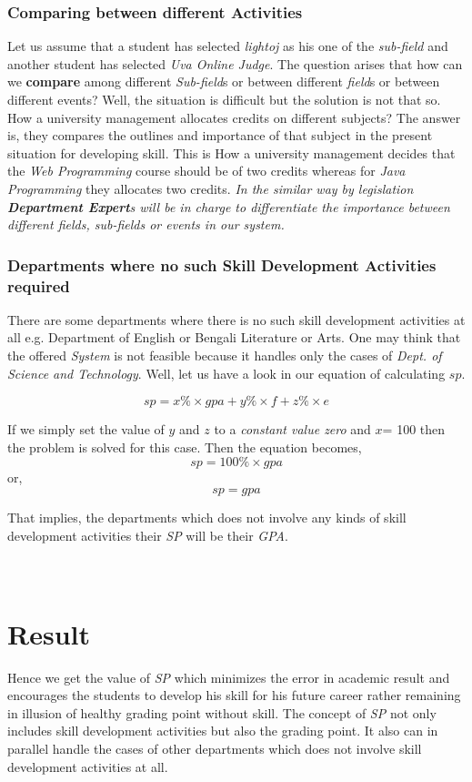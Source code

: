 \documentclass[conference]{IEEEtran}
\begin{document}
\subsubsection{\textbf{Comparing between different Activities}}
Let us assume that a student has selected \textit{lightoj} as his one of the \textit{sub-field} and another student has selected \textit{Uva Online Judge}. The question arises that how can we \textbf{compare} among different \textit{Sub-field}s or between different \textit{field}s or between different events? Well, the situation is difficult but the solution is not that so. How a university management allocates credits on different subjects? The answer is, they compares the outlines and importance of that subject in the present situation for developing skill. This is How a university management decides that the \textit{Web Programming} course should be of two credits whereas for \textit{Java Programming} they allocates two credits. \textit{In the similar way by legislation \textbf{Department Expert}s will be in charge to differentiate the importance between different fields, sub-fields or events in our system.} \\
\subsubsection{\textbf{Departments where no such Skill Development Activities required}}
There are some departments where there is no such skill development activities at all e.g. Department of English or Bengali Literature or Arts. One may think that the offered \textit{System} is not feasible because it handles only the cases of \textit{Dept. of Science and Technology}. Well, let us have a look in our equation of calculating $sp$.

$$sp= x\% \times gpa + y\% \times f + z\% \times e$$

If we simply set the value of $y$ and $z$ to a \textit{constant value zero} and $x$= 100 then the problem is solved for this case. Then the equation becomes,  
\\
$$sp= 100\% \times gpa$$
or, $$sp= gpa$$

That implies, the departments which does not involve any kinds of skill development activities their \textit{SP} will be their \textit{GPA}.\\\\\\



\section{Result}
Hence we get the value of \textit{SP} which minimizes the error in academic result and encourages the students to develop his skill for his future career rather remaining in illusion of healthy grading point without skill. The concept of \textit{SP} not only includes skill development activities but also the grading point. It also can in parallel handle the cases of other departments which does not involve skill development activities at all. \\\\\\
\end{document}
